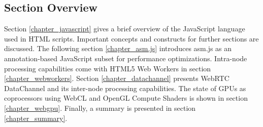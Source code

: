 \subsection{Section Overview}

Section \ref{chapter_javascript} gives a brief overview of the JavaScript language used in HTML scripts. Important concepts and constructs for further sections are discussed. The following section \ref{chapter_asm.js} introduces asm.js as an annotation-based JavaScript subset for performance optimizations. Intra-node processing capabilities come with HTML5 Web Workers in section \ref{chapter_webworkers}. Section \ref{chapter_datachannel} presents WebRTC DataChannel and its inter-node processing capabilities. The state of GPUs as coprocessors using WebCL and OpenGL Compute Shaders is shown in section \ref{chapter_webgpu}. Finally, a summary is presented in section \ref{chapter_summary}.
